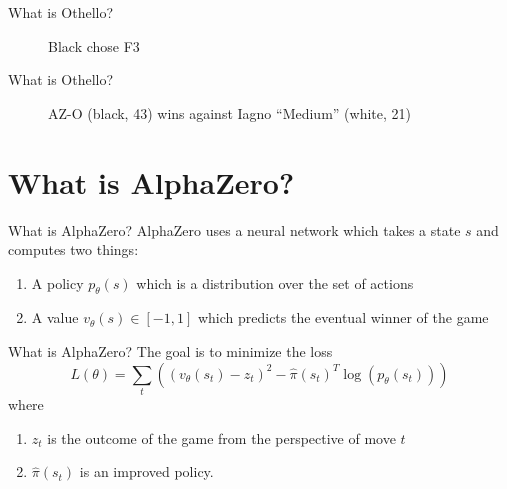 \documentclass{beamer}
\begin{document}
\begin{frame}{What is Othello?}
  \begin{figure}
    \centering
    \begin{othelloboard}{0.7}
      \dotmarkings
    \end{othelloboard}
    \caption{Black chose F3}
  \end{figure}
\end{frame}

\begin{frame}{What is Othello?}
  \begin{figure}
    \centering
    \begin{othelloboard}{0.7}
      \dotmarkings
    \end{othelloboard}
    \caption{AZ-O (black, 43) wins against Iagno ``Medium'' (white, 21)}
  \end{figure}
\end{frame}

\section{What is AlphaZero?}
\begin{frame}{What is AlphaZero?}
  AlphaZero uses a neural network which takes a state \(s\) and computes two things:
  \begin{enumerate}
  \item A policy \(p_\theta(s)\) which is a distribution over the set of actions
  \item A value \(v_\theta(s) \in [-1, 1]\) which predicts the eventual winner of the game
  \end{enumerate}
\end{frame}

\begin{frame}{What is AlphaZero?}
  The goal is to minimize the loss
  \[L(\theta) = \sum_t \left( \left(v_\theta(s_t) - z_t\right )^2 - \hat{\pi}(s_t)^T\log\left(p_\theta(s_t)\right) \right)\]
  where
  \begin{enumerate}
  \item \(z_t\) is the outcome of the game from the perspective of move \(t\)
  \item \(\hat{\pi}(s_t)\) is an improved policy.
  \end{enumerate}
\end{frame}
\end{document}
